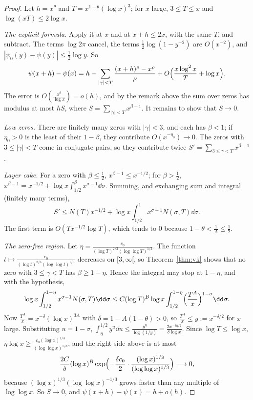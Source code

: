 \begin{proof}
Let $h=x^\theta$ and $T=x^{1-\theta}(\log x)^3$; for $x$ large, $3\le T\le x$ and $\log(xT)\le2\log x$.

\emph{The explicit formula.} Apply it at $x$ and at $x+h\le2x$, with the same $T$, and subtract. The terms $\log2\pi$ cancel, the terms $\frac12\log(1-y^{-2})$ are $O(x^{-2})$, and $|\psi_0(y)-\psi(y)|\le\frac12\log y$. So
\[
\psi(x+h)-\psi(x)=h-\sum_{|\gamma|<T}\frac{(x+h)^\rho-x^\rho}\rho+O\Bigl(\frac{x\log^2x}T+\log x\Bigr).
\]
The error is $O(\frac{x^\theta}{\log x})=o(h)$, and by the remark above the sum over zeros has modulus at most $hS$, where $S=\sum_{|\gamma|<T}x^{\beta-1}$. It remains to show that $S\to0$.

\emph{Low zeros.} There are finitely many zeros with $|\gamma|<3$, and each has $\beta<1$; if $\eta_0>0$ is the least of their $1-\beta$, they contribute $O(x^{-\eta_0})\to0$. The zeros with $3\le|\gamma|<T$ come in conjugate pairs, so they contribute twice $S'=\sum_{3\le\gamma<T}x^{\beta-1}$.

\emph{Layer cake.} For a zero with $\beta\le\frac12$, $x^{\beta-1}\le x^{-1/2}$; for $\beta>\frac12$, $x^{\beta-1}=x^{-1/2}+\log x\int_{1/2}^\beta x^{\sigma-1}\dd\sigma$. Summing, and exchanging sum and integral (finitely many terms),
\[
S'\le N(T)x^{-1/2}+\log x\int_{1/2}^1x^{\sigma-1}N(\sigma,T)\dd\sigma.
\]
The first term is $O(Tx^{-1/2}\log T)$, which tends to $0$ because $1-\theta<\frac1A\le\frac12$.

\emph{The zero-free region.} Let $\eta=\frac{c_0}{(\log T)^{2/3}(\log\log T)^{1/3}}$. The function $t\mapsto\frac{c_0}{(\log t)^{2/3}(\log\log t)^{1/3}}$ decreases on $[3,\infty[$, so Theorem~\ref{thm:vk} shows that no zero with $3\le\gamma<T$ has $\beta\ge1-\eta$. Hence the integral may stop at $1-\eta$, and with the hypothesis,
\[
\log x\int_{1/2}^{1-\eta}x^{\sigma-1}N(\sigma,T)\dd\sigma\le C(\log T)^B\log x\int_{1/2}^{1-\eta}\Bigl(\frac{T^A}x\Bigr)^{1-\sigma}\dd\sigma.
\]
Now $\frac{T^A}x=x^{-\delta}(\log x)^{3A}$ with $\delta=1-A(1-\theta)>0$, so $\frac{T^A}x\le y:=x^{-\delta/2}$ for $x$ large. Substituting $u=1-\sigma$, $\int_\eta^{1/2}y^u\dd u\le\frac{y^\eta}{\log(1/y)}=\frac{2x^{-\delta\eta/2}}{\delta\log x}$. Since $\log T\le\log x$, $\eta\log x\ge\frac{c_0(\log x)^{1/3}}{(\log\log x)^{1/3}}$, and the right side above is at most
\[
\frac{2C}\delta(\log x)^B\exp\Bigl(-\frac{\delta c_0}2\cdot\frac{(\log x)^{1/3}}{(\log\log x)^{1/3}}\Bigr)\longrightarrow0,
\]
because $(\log x)^{1/3}(\log\log x)^{-1/3}$ grows faster than any multiple of $\log\log x$. So $S\to0$, and $\psi(x+h)-\psi(x)=h+o(h)$.
\end{proof}

